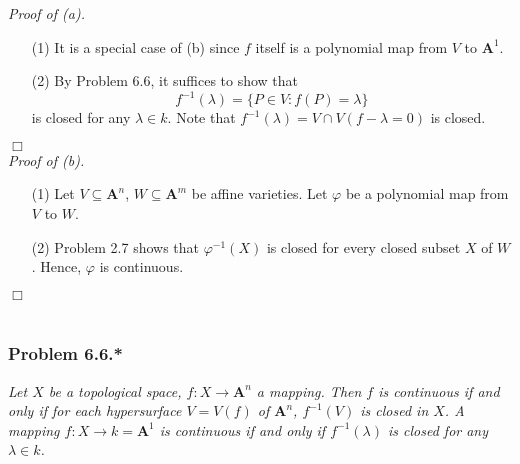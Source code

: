 \documentclass{article}
\begin{document}
\emph{Proof of (a).}
\begin{enumerate}
\item[(1)]
  It is a special case of (b) since $f$ itself is a polynomial map from
  $V$ to $\mathbf{A}^{1}$.

\item[(2)]
  By Problem 6.6, it suffices to show that
  \[
    f^{-1}(\lambda) = \{ P \in V : f(P) = \lambda \}
  \]
  is closed for any $\lambda \in k$.
  Note that $f^{-1}(\lambda) = V \cap V(f - \lambda = 0)$ is closed.
\end{enumerate}
$\Box$ \\



\emph{Proof of (b).}
\begin{enumerate}
\item[(1)]
  Let $V \subseteq \mathbf{A}^n$, $W \subseteq \mathbf{A}^m$ be affine varieties.
  Let $\varphi$ be a polynomial map from $V$ to $W$.

\item[(2)]
  Problem 2.7 shows that $\varphi^{-1}(X)$ is closed for every closed subset $X$ of $W$.
  Hence, $\varphi$ is continuous.
\end{enumerate}
$\Box$ \\\\






\subsubsection*{Problem 6.6.*}
\emph{Let $X$ be a topological space, $f: X \to \mathbf{A}^{n}$ a mapping.
Then $f$ is continuous if and only if for each hypersurface $V = V(f)$ of $\mathbf{A}^{n}$,
$f^{-1}(V)$ is closed in $X$.
A mapping $f: X \to k = \mathbf{A}^{1}$ is continuous if and only if
$f^{-1}(\lambda)$ is closed for any $\lambda \in k$.} \\
\end{document}
